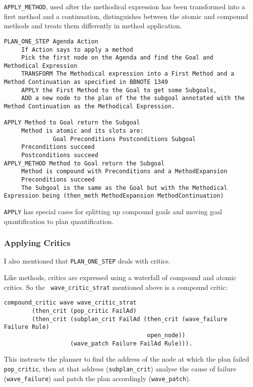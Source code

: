 {\tt APPLY\_METHOD}, used after the methodical expression has been
transformed into a first method and a continuation, distinguishes
between the atomic and compound methods and treats them differently in 
method application.

\begin{verbatim}
PLAN_ONE_STEP Agenda Action
     If Action says to apply a method
     Pick the first node on the Agenda and find the Goal and
Methodical Expression
     TRANSFORM The Methodical expression into a First Method and a
Method Continuation as specified in BBNOTE 1349
     APPLY the First Method to the Goal to get some Subgoals,
     ADD a new node to the plan of the the subgoal annotated with the
Method Continuation as the Methodical Expression.

APPLY Method to Goal return the Subgoal
     Method is atomic and its slots are: 
              Goal Preconditions Postconditions Subgoal
     Preconditions succeed
     Postconditions succeed
APPLY_METHOD Method to Goal return the Subgoal
     Method is compound with Preconditions and a MethodExpansion
     Preconditions succeed
     The Subgoal is the same as the Goal but with the Methodical
Expression being (then_meth MethodExpansion MethodContinuation)
\end{verbatim}

{\tt APPLY} has special cases for splitting up compound goals and
moving goal quantification to plan quantification.

\subsubsection{Applying Critics}
I also mentioned that {\tt PLAN\_ONE\_STEP} deals with
critics.  

Like methods, critics are expressed using a
waterfall of compound and atomic
critics.  So the {\tt
  wave\_critic\_strat} mentioned above is a 
compound critic:
\begin{verbatim}
compound_critic wave wave_critic_strat
        (then_crit (pop_critic FailAd)
        (then_crit (subplan_crit FailAd (then_crit (wave_failure Failure Rule)
                                         open_node))
                   (wave_patch Failure FailAd Rule))).
\end{verbatim}
This instructs the planner to find the address of the node at which
the plan failed {\tt pop\_critic}, then at that
address ({\tt subplan\_crit}) analyse the cause
of failure ({\tt wave\_failure}) and patch the
plan accordingly ({\tt wave\_patch}).

